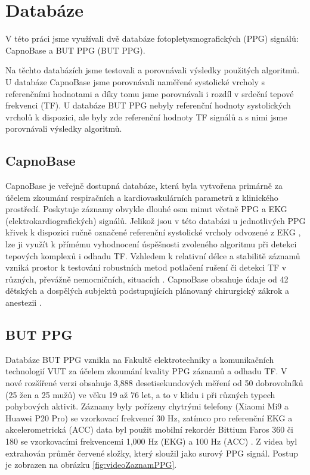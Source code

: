 \raggedbottom
\chapter{Databáze}

V této práci jsme využívali dvě databáze fotopletysmografických (\acs{PPG}) signálů: CapnoBase a \acl{BUT PPG} (BUT PPG).

Na těchto databázích jsme testovali a porovnávali výsledky použitých algoritmů.
U databáze CapnoBase jsme porovnávali naměřené systolické vrcholy s referenčními hodnotami a díky tomu jsme porovnávali i rozdíl v srdeční tepové frekvenci (\acs{TF}).
U databáze \acs{BUT PPG} nebyly referenční hodnoty systolických vrcholů k dispozici, ale byly zde referenční hodnoty \acs{TF} signálů a s nimi jsme porovnávali výsledky algoritmů.

\section{CapnoBase}

CapnoBase je veřejně dostupná databáze, která byla vytvořena primárně za účelem zkoumání respiračních a kardiovaskulárních parametrů z klinického prostředí.
Poskytuje záznamy obvykle dlouhé osm minut včetně \acs{PPG} a EKG (elektrokardiografických) signálů.
Jelikož jsou v této databázi u jednotlivých \acs{PPG} křivek k dispozici ručně označené referenční systolické vrcholy odvozené z EKG \cite{CapnoBase}, lze ji využít k přímému vyhodnocení úspěšnosti zvoleného algoritmu při detekci tepových komplexů i odhadu \acs{TF}.
Vzhledem k relativní délce a stabilitě záznamů vzniká prostor k testování robustních metod potlačení rušení či detekci \acs{TF} v různých, převážně nemocničních, situacích \cite{Karlen2013, Charlton2022}.
CapnoBase obsahuje údaje od 42 dětských a dospělých subjektů podstupujících plánovaný chirurgický zákrok a anestezii \cite{Charlton2022}.

\section{\acs{BUT PPG}}
Databáze \acs{BUT PPG} vznikla na Fakultě elektrotechniky a komunikačních technologií \acs{VUT} za účelem zkoumání kvality \acs{PPG} záznamů a odhadu \acs{TF}.
V nové rozšířené verzi obsahuje 3,888 desetisekundových měření od 50 dobrovolníků (25 žen a 25 mužů) ve věku 19 až 76 let, a to v klidu i při různých typech pohybových aktivit.
Záznamy byly pořízeny chytrými telefony (Xiaomi Mi9 a Huawei P20 Pro) se vzorkovací frekvencí 30 Hz, zatímco pro referenční EKG a akcelerometrická (ACC) data byl použit mobilní rekordér Bittium Faros 360 či 180 se vzorkovacími frekvencemi 1,000 Hz (EKG) a 100 Hz (ACC) \cite{BUT_PPG}.
Z videa byl extrahován průměr červené složky, který sloužil jako surový \acs{PPG} signál.
Postup je zobrazen na obrázku \ref{fig:videoZaznamPPG}.

